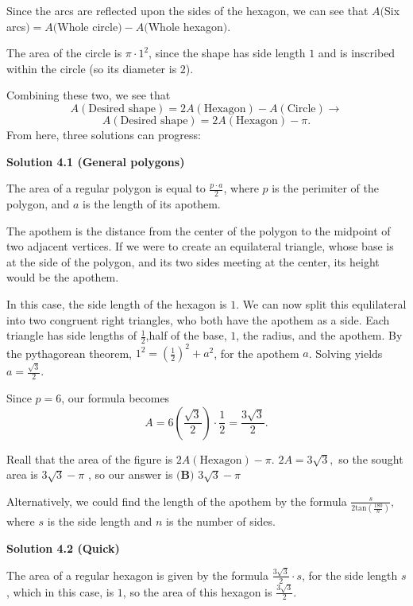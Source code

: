 \begin{enumerate}
 Since the arcs are reflected upon the sides of the hexagon, we can see that $A($Six arcs$)=A($Whole circle$)-A($Whole hexagon$)$. 

 The area of the circle is $\pi\cdot{1^2}$, since the shape has side length $1$ and is inscribed within the circle (so its diameter is $2$).

 Combining these two, we see that 
 \[A(\text{Desired shape})=2A(\text{Hexagon})-A(\text{Circle}) \rightarrow\]
 \[A(\text{Desired shape})=2A(\text{Hexagon})-\pi.\]From here, three solutions can progress: 

 



\textbf{Solution 4.1 (General polygons)}

The area of a regular polygon is equal to $\frac{p\cdot{a}}{2}$, where $p$ is the perimiter of the polygon, and $a$ is the length of its apothem.

 The apothem is the distance from the center of the polygon to the midpoint of two adjacent vertices. If we were to create an equilateral triangle, whose base is at the side of the polygon, and its two sides meeting at the center, its height would be the apothem. 

 In this case, the side length of the hexagon is $1$. We can now split this equlilateral into two congruent right triangles, who both have the apothem as a side. Each triangle has side lengths of $\frac{1}{2}$,half of the base, $1$, the radius, and the apothem. By the pythagorean theorem, $1^2=(\frac{1}{2})^2+a^2$, for the apothem $a$. Solving yields $a=\frac{\sqrt{3}}{2}.$ 

 Since $p=6$, our formula becomes 
 \[A=6(\frac{\sqrt{3}}{2})\cdot{\frac{1}{2}}=\frac{3\sqrt{3}}{2}.\]

 Reall that the area of the figure is $2A(\text{Hexagon})-\pi.$ $2A=3\sqrt{3},$ so the sought area is $3\sqrt{3}-\pi$ , so our answer is $\boxed{\textbf{(B) }3 \sqrt{3} - \pi}$

 Alternatively, we could find the length of the apothem by the formula $\frac{s}{2\text{tan}(\frac{180}{n})},$ where $s$ is the side length and $n$ is the number of sides.

 



\textbf{Solution 4.2 (Quick)}

The area of a regular hexagon is given by the formula $\frac{3\sqrt{3}}{2}\cdot{s}$, for the side length $s$, which in this case, is $1$, so the area of this hexagon is $\frac{3\sqrt{3}}{2}.$


\end{enumerate}
